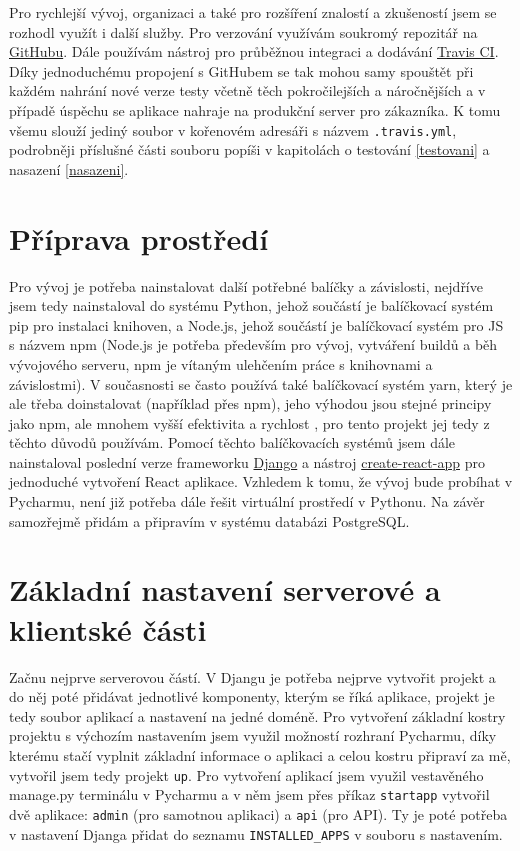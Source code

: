     Pro rychlejší vývoj, organizaci a také pro rozšíření znalostí a zkušeností jsem se rozhodl využít i další služby. Pro verzování využívám soukromý repozitář na \href{https://github.com/}{GitHubu}. Dále používám nástroj pro průběžnou integraci a dodávání \href{https://travis-ci.com/}{Travis CI}. Díky jednoduchému propojení s GitHubem se tak mohou samy spouštět při každém nahrání nové verze testy včetně těch pokročilejších a náročnějších a v případě úspěchu se aplikace nahraje na produkční server pro zákazníka. K tomu všemu slouží jediný soubor v kořenovém adresáři s názvem \verb|.travis.yml|, podrobněji příslušné části souboru popíši v kapitolách o testování \ref{testovani} a nasazení \ref{nasazeni}.
    
    \section{Příprava prostředí}
    Pro vývoj je potřeba nainstalovat další potřebné balíčky a závislosti, nejdříve jsem tedy nainstaloval do systému Python, jehož součástí je balíčkovací systém pip pro instalaci knihoven, a Node.js, jehož součástí je balíčkovací systém pro JS s názvem npm (Node.js je potřeba především pro vývoj, vytváření buildů a běh vývojového serveru, npm je vítaným ulehčením práce s knihovnami a závislostmi). V současnosti se často používá také balíčkovací systém yarn, který je ale třeba doinstalovat (například přes npm), jeho výhodou jsou stejné principy jako npm, ale mnohem vyšší efektivita a rychlost \cite{yarn}, pro tento projekt jej tedy z těchto důvodů používám. Pomocí těchto balíčkovacích systémů jsem dále nainstaloval poslední verze frameworku \href{https://www.djangoproject.com/}{Django} a nástroj \href{https://github.com/facebook/create-react-app}{create-react-app} pro jednoduché vytvoření React aplikace. Vzhledem k tomu, že vývoj bude probíhat v Pycharmu, není již potřeba dále řešit virtuální prostředí v Pythonu. Na závěr samozřejmě přidám a připravím v systému databázi PostgreSQL.
    
    \section{Základní nastavení serverové a klientské části}\label{zakladninastaveni}
    Začnu nejprve serverovou částí. V Djangu je potřeba nejprve vytvořit projekt a do něj poté přidávat jednotlivé komponenty, kterým se říká aplikace, projekt je tedy soubor aplikací a nastavení na jedné doméně. Pro vytvoření základní kostry projektu s výchozím nastavením jsem využil možností rozhraní Pycharmu, díky kterému stačí vyplnit základní informace o aplikaci a celou kostru připraví za mě, vytvořil jsem tedy projekt \verb|up|. Pro vytvoření aplikací jsem využil vestavěného manage.py terminálu v Pycharmu a v něm jsem přes příkaz \verb|startapp| vytvořil dvě aplikace: \verb|admin| (pro samotnou aplikaci) a \verb|api| (pro API). Ty je poté potřeba v nastavení Djanga přidat do seznamu \verb|INSTALLED_APPS| v souboru s nastavením.
    
